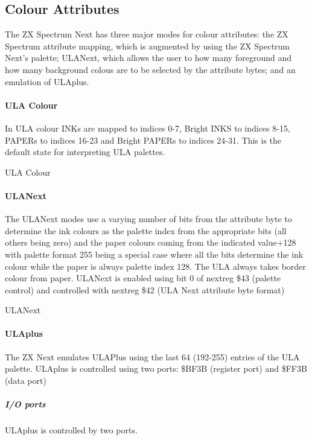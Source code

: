 \subsection{Colour Attributes}
The ZX Spectrum Next has three major modes for colour attributes: the
ZX Spectrum attribute mapping, which is augmented by using the ZX
Spectrum Next's palette; ULANext, which allows the user to how many
foreground and how many background colous are to be selected by the
attribute bytes; and an emulation of ULAplus.

\paragraph{ULA Colour}
In ULA colour INKs are mapped to indices 0-7, Bright INKS to indices
8-15, PAPERs to indices 16-23 and Bright PAPERs to indices 24-31. This
is the default state for interpreting ULA palettes.

\begin{table}[h]\centering
  \caption{ULA Colour}
\end{table}

\paragraph{ULANext}
The ULANext modes use a varying number of bits from the attribute
byte to determine the ink colours as the palette index from the
appropriate bits (all others being zero) and the paper colours coming
from the indicated value+128 with palette format 255 being a special
case where all the bits determine the ink colour while the paper is
always palette index 128. The ULA always takes border colour from
paper. ULANext is enabled using bit 0 of nextreg \$43 (palette
control) and controlled with nextreg \$42 (ULA Next attribute byte
format)

\begin{table}[h]\centering
  \caption{ULANext}
\end{table}

\paragraph{ULAplus}
The ZX Next emulates ULAPlus using the last 64 (192-255) entries of
the ULA palette. ULAplus is controlled using two ports: \$BF3B (register
port) and \$FF3B (data port)

\subparagraph{I/O ports}
ULAplus is controlled by two ports.

